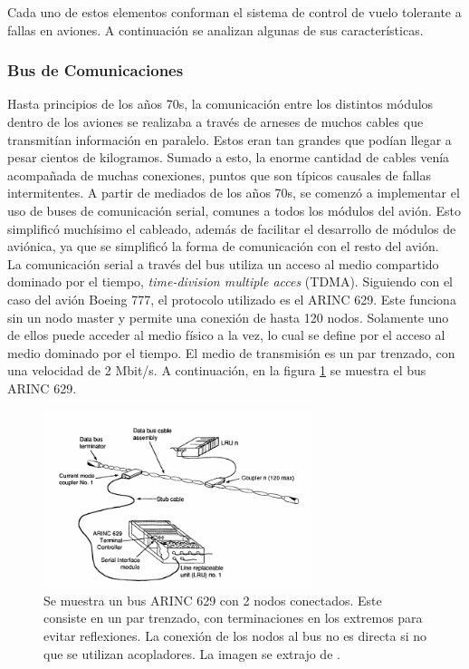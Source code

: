 Cada uno de estos elementos conforman el sistema de control de vuelo tolerante a fallas en aviones. A continuación se analizan algunas de sus características.

\subsubsection{Bus de Comunicaciones}

Hasta principios de los años 70s, la comunicación entre los distintos módulos dentro de los aviones se realizaba a través de arneses de muchos cables que transmitían información en paralelo. Estos eran tan grandes que podían llegar a pesar cientos de kilogramos. Sumado a esto, la enorme cantidad de cables venía acompañada de muchas conexiones, puntos que son típicos causales de fallas intermitentes. A partir de mediados de los años 70s, se comenzó a implementar el uso de buses de comunicación serial, comunes a todos los módulos del avión. Esto simplificó muchísimo el cableado, además de facilitar el desarrollo de módulos de aviónica, ya que se simplificó la forma de comunicación con el resto del avión.\\

La comunicación serial a través del bus utiliza un acceso al medio compartido dominado por el tiempo, \textit{time-division multiple acces} (TDMA). Siguiendo con el caso del avión Boeing 777, el protocolo utilizado es el ARINC 629. Este funciona sin un nodo master y permite una conexión de hasta 120 nodos. Solamente uno de ellos puede acceder al medio físico a la vez, lo cual se define por el acceso al medio dominado por el tiempo. El medio de transmisión es un par trenzado, con una velocidad de 2 Mbit/s. A continuación, en la figura \ref{fig:ARINC_629_bus} se muestra el bus ARINC 629.

\begin{figure}[H]
    \centering
    \includegraphics[width=0.7\textwidth]{img/ARINC_629_bus.png}
    \caption{Se muestra un bus ARINC 629 con 2 nodos conectados. Este consiste en un par trenzado, con terminaciones en los extremos para evitar reflexiones. La conexión de los nodos al bus no es directa si no que se utilizan acopladores. La imagen se extrajo de \cite{yeh1996triple}.}
    \label{fig:ARINC_629_bus}    
\end{figure}

